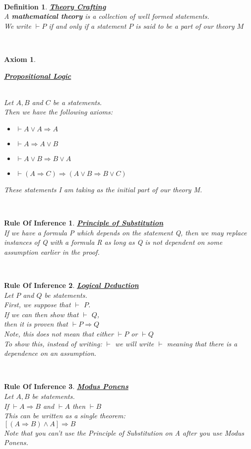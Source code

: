 \documentclass[12pt]{extarticle}
\theoremstyle{plain}
\theoremstyle{plain}
\newtheorem{axiom}{Axiom}[section]
\theoremstyle{plain}
\theoremstyle{Definition}
\newtheorem{def.}{Definition}[section]
\theoremstyle{Definition}
\theoremstyle{plain}
\theoremstyle{plain}
\newtheorem{ruleOfInference}{Rule Of Inference}[section]
\newcommand{\cut}[0]{\noindent\framebox[\linewidth]{\rule{\linewidth}{2pt}}\\}
\newcommand{\ddash}{\boxed{\vdash}}
\begin{document}
\cut
\begin{def.} \underline{\textbf{Theory Crafting}} \\ 
	A \textbf{mathematical theory} is a collection of well formed statements. \\ 	
	We write $\vdash P$ if and only if a statement $P$ is said to be a part of our theory $M$ 
\end{def.}
\cut
\begin{axiom} \hypertarget{Axioms}{\underline{\textbf{Propositional Logic}} } \\
	Let $A,B$ and $C$ be a statements.\\
	Then we have the following axioms: 
	\begin{itemize}
		\item $\vdash A \lor A \Rightarrow A$ 
		\item $\vdash A \Rightarrow A \lor B$ 
		\item $\vdash A \lor B \Rightarrow B \lor A$ 
		\item $\vdash (A \Rightarrow C) \Rightarrow ( A \lor B \Rightarrow B \lor C ) $
	\end{itemize}
	These statements I am taking as the initial part of our theory M. 
\end{axiom}
\cut 
\begin{ruleOfInference} \underline{\textbf{Principle of Substitution}} \\
If we have a formula P which depends on the statement Q, then we may replace instances of Q with a formula R as long as Q is not dependent on some assumption earlier in the proof. 
\end{ruleOfInference}
\cut
\begin{ruleOfInference} \underline{\textbf{Logical Deduction}} \\
	Let $P$ and $Q$ be statements. \\ 
	First, we suppose that $\ddash$ $P$. \\
	If we can then show that $\ddash$ $Q$, \\
	then it is proven that $\vdash P \Rightarrow Q$ \\
	Note, this does not mean that either $\vdash P$ or $\vdash Q$  \\
	To show this, instead of writing: $\vdash$ we will write $\ddash$ meaning that there is a dependence on an assumption. 
\end{ruleOfInference}
\cut 
\begin{ruleOfInference} \underline{\textbf{Modus Ponens}} \\
	Let $A,B$ be statements. \\
	If $\vdash A \Rightarrow B$ and $\vdash A$ then $\vdash B$ \\
	This can be written as a single theorem: \\ 
	$[(A \Rightarrow B) \wedge A] \Rightarrow B$ \\
	Note that you can't use the Principle of Substitution on A after you use Modus Ponens. 
\end{ruleOfInference}
\end{document}

